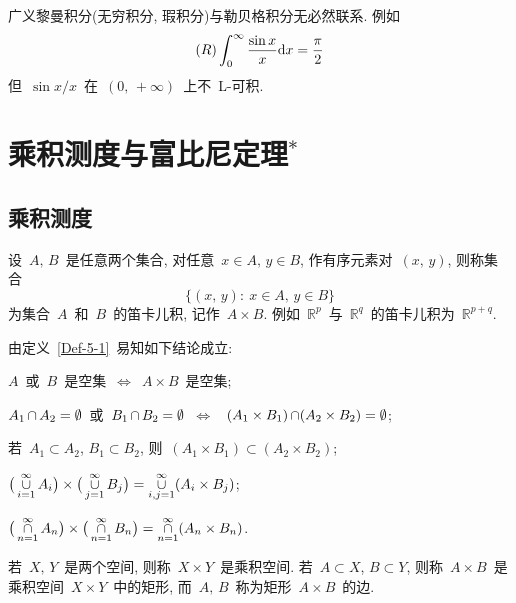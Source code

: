 \begin{remark}
广义黎曼积分(无穷积分, 瑕积分)与勒贝格积分无必然联系. 例如
\[
(R) \int_0 ^\infty \frac{\sin x}{x} \mathrm{d} x = \frac{\mathrm{\pi}}{2}
\]
但~$\sin x/x$~在~$(0,\, +\infty)$~上不~L-可积.
\end{remark}

\section{乘积测度与富比尼定理$^\ast$}

\subsection{乘积测度}

\begin{definition}\label{Def-5-1}
设~$A,\, B$~是任意两个集合, 对任意~$x\in A, \, y\in B$, 作有序元素对~$(x,\, y)$, 则称集合
\[
\big\{(x,\, y): \: x\in A,\, y\in B\big\}
\]
为集合~$A$~和~$B$~的笛卡儿积, 记作~$A \times B$. 例如~$\mathbb{R}^{p}$~与~$\mathbb{R}^{q}$~的笛卡儿积为~$\mathbb{R}^{p+q}$.
\end{definition}

由定义~\ref{Def-5-1}~易知如下结论成立:

\begin{publist}
  \item [(1)] $A$~或~$B$~是空集~$\Longleftrightarrow$~$A\times B$~是空集;
  \item [(2)] $A_1\mathop{\cap} A_2=\emptyset$~或~$B_1\mathop{\cap} B_2=\emptyset$~$\Longleftrightarrow$~
  $(A_1\times B_1)\mathop{\cap} (A_2\times B_2)=\emptyset$;
  \item [(3)] 若~$A_1 \subset A_2$, $B_1 \subset B_2$, 则~$(A_1 \times B_1) \subset (A_2 \times B_2)$;
  \item [(4)] $\big(\mathop{\cup}\limits_{i=1}^{\infty}A_{i}\big)\times  \big(\mathop{\cup}\limits_{j=1}^{\infty}B_{j}\big)=\mathop{\cup}\limits_{i, j=1}^{\infty}(A_{i}\times B_{j})$;
  \item [(5)] $\big(\mathop{\cap}\limits_{n=1}^{\infty}A_{n}\big)\times  \big(\mathop{\cap}\limits_{n=1}^{\infty}B_{n}\big)=\mathop{\cap}\limits_{n=1}^{\infty}(A_{n} \times B_{n})$.
\end{publist}

\begin{definition}\label{Def-5-2}
若~$X,\, Y$~是两个空间, 则称~$X \times Y$~是乘积空间. 若~$A \subset X$, $B \subset Y$, 则称~$A \times B$~是乘积空间~$X\times Y$~中的矩形, 而~$A,\, B$~称为矩形~$A \times B$~的边.
\end{definition}

